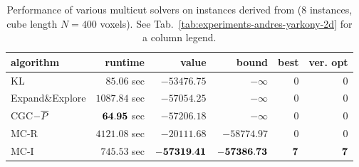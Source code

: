 \begin{table}
\scriptsize
\centering
\begin{tabular}{lrrrrr}
\toprule
           algorithm &         runtime       &           value &           bound &       best &   ver. opt   \\ \midrule 
                  KL & $        85.06$ sec & $    -53476.75$ & $      -\infty$ & $       0$ & $       0$ \\
    Expand\&Explore & $      1087.84$ sec & $    -57054.25$ & $      -\infty$ & $       0$ & $       0$ \\
      CGC$-{\overline{P}}$ & $   {\bf64.95}$ sec & $    -57206.18$ & $      -\infty$ & $       0$ & $       0$ \\   
\cmidrule{1-1} 
                MC-R & $      4121.08$ sec & $    -20111.68$ & $    -58774.97$ & $       0$ & $       0$ \\ 
\cmidrule{1-1} 
                MC-I & $       745.53$ sec & $ {\bf-57319.41}$ & ${\bf-57386.73}$ & ${\bf7}$ & $  {\bf7}$ \\ 
\bottomrule
\end{tabular}
\caption{Performance of various multicut solvers on
instances derived from \cite{kroeger_2012_eccv}
(8 instances, cube length $N=400$ voxels).
See Tab.~\ref{tab:experiments-andres-yarkony-2d} for a column legend.
\label{tab:smalltable-knott-3d-400}}
\end{table}

